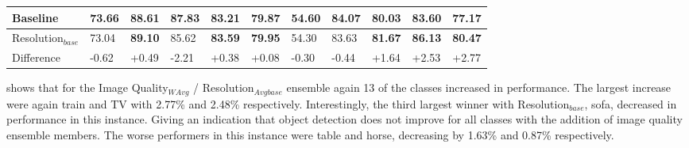 \begin{table}[h]
{\begin{tabular}{lllllllllll}
\multicolumn{1}{|l|}{Baseline}        & \multicolumn{1}{l|}{\textbf{73.66}} & \multicolumn{1}{l|}{88.61} & \multicolumn{1}{l|}{\textbf{87.83}} & \multicolumn{1}{l|}{83.21} & \multicolumn{1}{l|}{79.87}  & \multicolumn{1}{l|}{\textbf{54.60}} & \multicolumn{1}{l|}{\textbf{84.07}} & \multicolumn{1}{l|}{80.03} & \multicolumn{1}{l|}{83.60} & \multicolumn{1}{l|}{77.17} \\ \hline
\multicolumn{1}{|l|}{Resolution$_{base}$} & \multicolumn{1}{l|}{73.04} & \multicolumn{1}{l|}{\textbf{89.10}} & \multicolumn{1}{l|}{85.62} & \multicolumn{1}{l|}{\textbf{83.59}} & \multicolumn{1}{l|}{\textbf{79.95}}  & \multicolumn{1}{l|}{54.30} & \multicolumn{1}{l|}{83.63} & \multicolumn{1}{l|}{\textbf{81.67}} & \multicolumn{1}{l|}{\textbf{86.13}} & \multicolumn{1}{l|}{\textbf{80.47}} \\ \hline
\multicolumn{1}{|l|}{Difference}     & \multicolumn{1}{l|}{-0.62} & \multicolumn{1}{l|}{+0.49} & \multicolumn{1}{l|}{-2.21} & \multicolumn{1}{l|}{+0.38} & \multicolumn{1}{l|}{+0.08}  & \multicolumn{1}{l|}{-0.30} & \multicolumn{1}{l|}{-0.44} & \multicolumn{1}{l|}{+1.64} & \multicolumn{1}{l|}{+2.53} & \multicolumn{1}{l|}{+2.77} \\ \hline
\end{tabular}
%
}
\end{table}
 
 shows that for the Image Quality$_{WAvg}$ / Resolution$_{Avgbase}$ ensemble again 13 of the classes increased in performance. The largest increase were again train and TV with 2.77\% and 2.48\% respectively. Interestingly, the third largest winner with Resolution$_{base}$, sofa, decreased in performance in this instance. Giving an indication that object detection does not improve for all classes with the addition of image quality ensemble members. The worse performers in this instance were table and horse, decreasing by 1.63\% and 0.87\% respectively.


